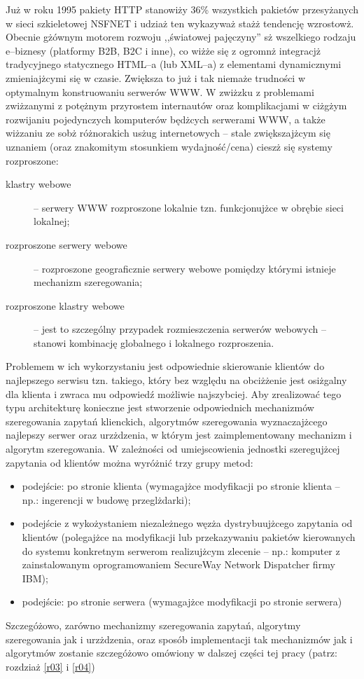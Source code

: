Już w roku 1995 pakiety HTTP stanowiży 36\% wszystkich pakietów przesyżanych w
sieci szkieletowej NSFNET \cite{barylo2} i udziaż ten wykazyważ stażż tendencję wzrostowż. Obecnie gżównym motorem rozwoju
,,światowej pajęczyny'' sż wszelkiego rodzaju e--biznesy (platformy B2B, B2C i inne), co wiżże się z ogromnż
integracjż tradycyjnego statycznego HTML--a (lub XML--a) z elementami dynamicznymi zmieniajżcymi się w czasie.
Zwiększa to już i tak niemaże trudności w optymalnym konstruowaniu serwerów WWW. W zwiżzku z problemami
zwiżzanymi z potężnym przyrostem internautów oraz komplikacjami w ciżgżym rozwijaniu pojedynczych komputerów
będżcych serwerami WWW, a także wiżzaniu ze sobż różnorakich usżug internetowych -- stale zwiększajżcym się
uznaniem (oraz znakomitym stosunkiem wydajność/cena) cieszż się systemy rozproszone:
\begin{description}
\item[klastry webowe] -- serwery WWW rozproszone lokalnie tzn. funkcjonujżce w obrębie sieci lokalnej;
\item[rozproszone serwery webowe] -- rozproszone geograficznie serwery webowe pomiędzy którymi istnieje mechanizm szeregowania;
\item[rozproszone klastry webowe] -- jest to szczególny przypadek rozmieszczenia serwerów webowych -- stanowi kombinację
globalnego i lokalnego rozproszenia.
\end{description}
Problemem w ich wykorzystaniu
jest odpowiednie skierowanie klientów do najlepszego serwisu tzn. takiego, który bez względu na obciżżenie jest osiżgalny dla
klienta i zwraca mu odpowiedź możliwie najszybciej. Aby zrealizować tego typu architekturę konieczne jest stworzenie
odpowiednich mechanizmów szeregowania zapytań klienckich, algorytmów szeregowania wyznaczajżcego najlepszy serwer oraz
urzżdzenia, w którym jest zaimplementowany mechanizm i algorytm szeregowania. W zależności od umiejscowienia jednostki
szeregujżcej zapytania od klientów można wyróżnić trzy grupy metod:
\begin{itemize}
\item podejście: po stronie klienta (wymagajżce modyfikacji po stronie klienta -- np.: ingerencji w budowę przeglżdarki);
\item podejście z wykożystaniem niezależnego węzża dystrybuujżcego zapytania od klientów (polegajżce na modyfikacji lub przekazywaniu
pakietów kierowanych do systemu konkretnym serwerom realizujżcym zlecenie -- np.: komputer z zainstalowanym oprogramowaniem SecureWay Network Dispatcher firmy IBM);
\item podejście: po stronie serwera (wymagajżce modyfikacji po stronie serwera)
\end{itemize}
Szczegóżowo, zarówno mechanizmy szeregowania zapytań, algorytmy szeregowania jak i urzżdzenia, oraz sposób implementacji tak
mechanizmów jak i algorytmów zostanie szczegóżowo omówiony w dalszej części tej pracy (patrz: rozdziaż \ref{r03} i \ref{r04})

